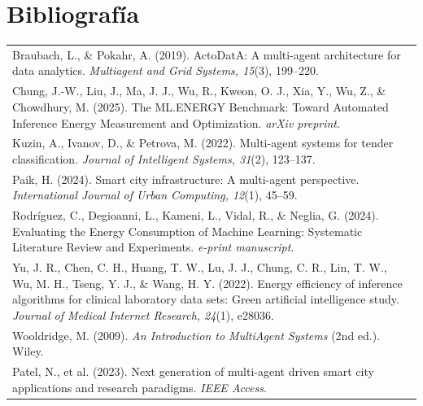 \documentclass[12pt,oneside]{report}
\begin{document}
\chapter*{Bibliografía}
\begin{longtable}{@{}p{}@{}}
Braubach, L., \& Pokahr, A. (2019). ActoDatA: A multi-agent architecture for data analytics. \textit{Multiagent and Grid Systems, 15}(3), 199–220.\\
Chung, J.-W., Liu, J., Ma, J. J., Wu, R., Kweon, O. J., Xia, Y., Wu, Z., \& Chowdhury, M. (2025). The ML.ENERGY Benchmark: Toward Automated Inference Energy Measurement and Optimization. \textit{arXiv preprint}.\\
Kuzin, A., Ivanov, D., \& Petrova, M. (2022). Multi-agent systems for tender classification. \textit{Journal of Intelligent Systems, 31}(2), 123–137.\\
Paik, H. (2024). Smart city infrastructure: A multi-agent perspective. \textit{International Journal of Urban Computing, 12}(1), 45–59.\\
Rodríguez, C., Degioanni, L., Kameni, L., Vidal, R., \& Neglia, G. (2024). Evaluating the Energy Consumption of Machine Learning: Systematic Literature Review and Experiments. \textit{e-print manuscript}.\\
Yu, J. R., Chen, C. H., Huang, T. W., Lu, J. J., Chung, C. R., Lin, T. W., Wu, M. H., Tseng, Y. J., \& Wang, H. Y. (2022). Energy efficiency of inference algorithms for clinical laboratory data sets: Green artificial intelligence study. \textit{Journal of Medical Internet Research, 24}(1), e28036.\\
Wooldridge, M. (2009). \textit{An Introduction to MultiAgent Systems} (2nd ed.). Wiley.\\
Patel, N., et al. (2023). Next generation of multi-agent driven smart city applications and research paradigms. \textit{IEEE Access}.\\
\end{longtable}
\end{document}
